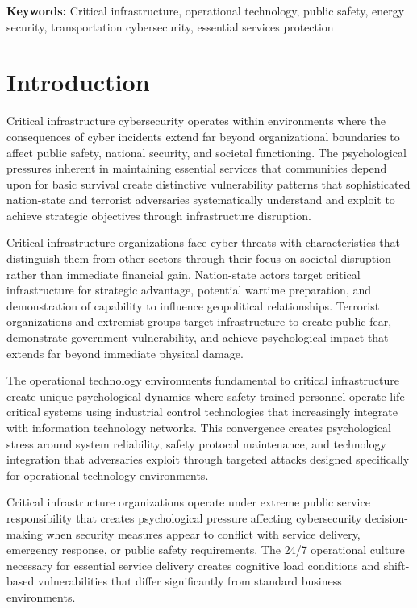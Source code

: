 \documentclass[10pt, twocolumn]{article}
\begin{document}
\textbf{Keywords:} Critical infrastructure, operational technology, public safety, energy security, transportation cybersecurity, essential services protection

\section{Introduction}

Critical infrastructure cybersecurity operates within environments where the consequences of cyber incidents extend far beyond organizational boundaries to affect public safety, national security, and societal functioning. The psychological pressures inherent in maintaining essential services that communities depend upon for basic survival create distinctive vulnerability patterns that sophisticated nation-state and terrorist adversaries systematically understand and exploit to achieve strategic objectives through infrastructure disruption.

Critical infrastructure organizations face cyber threats with characteristics that distinguish them from other sectors through their focus on societal disruption rather than immediate financial gain. Nation-state actors target critical infrastructure for strategic advantage, potential wartime preparation, and demonstration of capability to influence geopolitical relationships. Terrorist organizations and extremist groups target infrastructure to create public fear, demonstrate government vulnerability, and achieve psychological impact that extends far beyond immediate physical damage.

The operational technology environments fundamental to critical infrastructure create unique psychological dynamics where safety-trained personnel operate life-critical systems using industrial control technologies that increasingly integrate with information technology networks. This convergence creates psychological stress around system reliability, safety protocol maintenance, and technology integration that adversaries exploit through targeted attacks designed specifically for operational technology environments.

Critical infrastructure organizations operate under extreme public service responsibility that creates psychological pressure affecting cybersecurity decision-making when security measures appear to conflict with service delivery, emergency response, or public safety requirements. The 24/7 operational culture necessary for essential service delivery creates cognitive load conditions and shift-based vulnerabilities that differ significantly from standard business environments.
\end{document}
